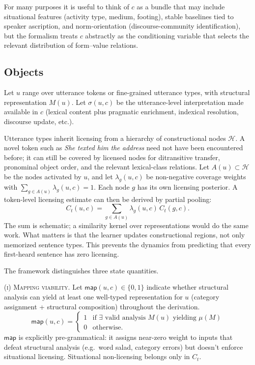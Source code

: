 \documentclass[12pt,letterpaper]{article}
\newcommand{\mention}[1]{\textit{#1}}
\begin{document}
For many purposes it is useful to think of $c$ as a bundle that may include
situational features (activity type, medium, footing), stable baselines tied to
speaker ascription, and norm-orientation (discourse-community identification),
but the formalism treats $c$ abstractly as the conditioning variable that selects
the relevant distribution of form--value relations.

\subsection{Objects}
\label{sec:objects}

Let $u$ range over utterance tokens or fine-grained utterance types, with
structural representation $M(u)$. Let $\sigma(u,c)$ be the utterance-level
interpretation made available in $c$ (lexical content plus pragmatic enrichment,
indexical resolution, discourse update, etc.).

Utterance types inherit licensing from a hierarchy of constructional nodes
$\mathcal{H}$. A novel token such as \mention{She texted him the address} need
not have been encountered before; it can still be covered by licensed nodes for
ditransitive transfer, pronominal object order, and the relevant lexical-class
relations. Let $A(u)\subset\mathcal{H}$ be the nodes activated by $u$, and let
$\lambda_g(u,c)$ be non-negative coverage weights with
$\sum_{g\in A(u)}\lambda_g(u,c)=1$. Each node $g$ has its own licensing
posterior. A token-level licensing estimate can then be derived by partial
pooling:
\begin{equation*}
C_t(u,c)=\sum_{g\in A(u)}\lambda_g(u,c)\,C_t(g,c).
\end{equation*}
The sum is schematic; a similarity kernel over representations would do the
same work. What matters is that the learner updates constructional regions, not
only memorized sentence types. This prevents the dynamics from predicting that
every first-heard sentence has zero licensing.

The framework distinguishes three state quantities.

\textsc{(i) Mapping viability.}
Let $\mathsf{map}(u,c)\in\{0,1\}$ indicate whether structural analysis can yield at least one well-typed representation for $u$ (category assignment + structural composition) throughout the derivation.
\begin{equation*}
\mathsf{map}(u,c)=
\begin{cases}
1 & \text{if }\exists \text{ valid analysis } M(u) \text{ yielding } \mu(M)\\
0 & \text{otherwise.}
\end{cases}
\end{equation*}
$\mathsf{map}$ is explicitly pre-grammatical: it assigns near-zero weight to inputs that defeat structural analysis (e.g.\ word salad, category errors) but doesn't enforce situational licensing. Situational non-licensing belongs only in $C_t$.
\end{document}

